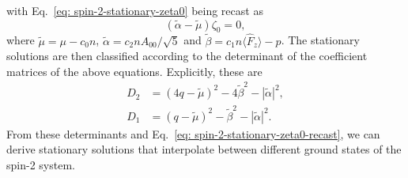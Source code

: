 with Eq.~\eqref{eq: spin-2-stationary-zeta0} being recast as
\begin{equation}\label{eq: spin-2-stationary-zeta0-recast}
    (\tilde{\alpha} - \tilde{\mu})\zeta_0 = 0,
\end{equation}
where \(\tilde{\mu} = \mu - c_0n\), \(\tilde{\alpha} = c_2nA_{00}/\sqrt{5}\) and
\(\tilde{\beta} = c_1n\langle\hat{F}_z\rangle - p\).
The stationary solutions are then classified according to the determinant of
the coefficient matrices of the above equations.
Explicitly, these are
\begin{align}
    D_2 & = {(4q-\tilde{\mu})}^2 -4\tilde{\beta}^2 - |\tilde{\alpha}|^2,
    \label{eq: D2}                                                        \\
    D_1 & = {(q - \tilde{\mu})}^2 - \tilde{\beta}^2 - |\tilde{\alpha}|^2.
    \label{eq: D1}
\end{align}
From these determinants and Eq.~\eqref{eq: spin-2-stationary-zeta0-recast},
we can derive stationary solutions that interpolate between different ground
states of the spin-2 system.

